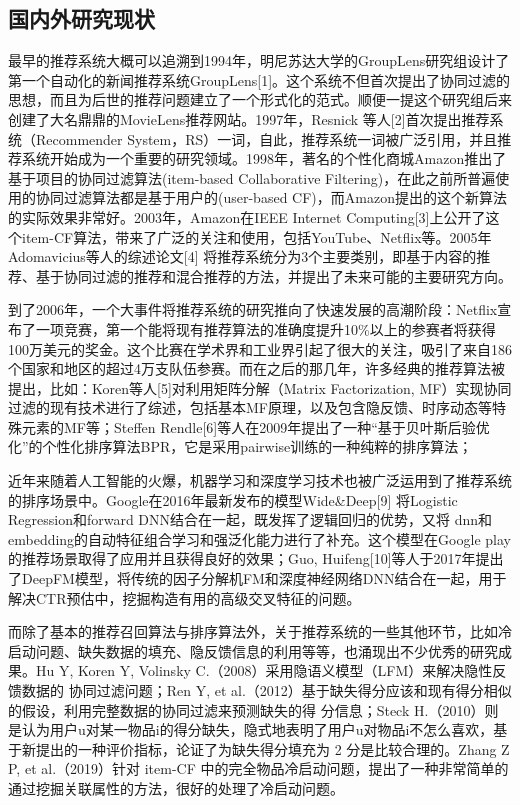 \documentclass{article}
\begin{document}
	\subsection{国内外研究现状}
	最早的推荐系统大概可以追溯到1994年，明尼苏达大学的GroupLens研究组设计了第一个自动化的新闻推荐系统GroupLens[1]。这个系统不但首次提出了协同过滤的思想，而且为后世的推荐问题建立了一个形式化的范式。顺便一提这个研究组后来创建了大名鼎鼎的MovieLens推荐网站。1997年，Resnick 等人[2]首次提出推荐系统（Recommender System，RS）一词，自此，推荐系统一词被广泛引用，并且推荐系统开始成为一个重要的研究领域。1998年，著名的个性化商城Amazon推出了基于项目的协同过滤算法(item-based Collaborative Filtering)，在此之前所普遍使用的协同过滤算法都是基于用户的(user-based CF)，而Amazon提出的这个新算法的实际效果非常好。2003年，Amazon在IEEE Internet Computing[3]上公开了这个item-CF算法，带来了广泛的关注和使用，包括YouTube、Netflix等。2005年Adomavicius等人的综述论文[4] 将推荐系统分为3个主要类别，即基于内容的推荐、基于协同过滤的推荐和混合推荐的方法，并提出了未来可能的主要研究方向。

	到了2006年，一个大事件将推荐系统的研究推向了快速发展的高潮阶段：Netflix宣布了一项竞赛，第一个能将现有推荐算法的准确度提升10\%以上的参赛者将获得100万美元的奖金。这个比赛在学术界和工业界引起了很大的关注，吸引了来自186个国家和地区的超过4万支队伍参赛。而在之后的那几年，许多经典的推荐算法被提出，比如：Koren等人[5]对利用矩阵分解（Matrix Factorization, MF）实现协同过滤的现有技术进行了综述，包括基本MF原理，以及包含隐反馈、时序动态等特殊元素的MF等；Steffen Rendle[6]等人在2009年提出了一种“基于贝叶斯后验优化”的个性化排序算法BPR，它是采用pairwise训练的一种纯粹的排序算法；

	近年来随着人工智能的火爆，机器学习和深度学习技术也被广泛运用到了推荐系统的排序场景中。Google在2016年最新发布的模型Wide\&Deep[9]
	将Logistic Regression和forward DNN结合在一起，既发挥了逻辑回归的优势，又将
	dnn和embedding的自动特征组合学习和强泛化能力进行了补充。这个模型在Google play的推荐场景取得了应用并且获得良好的效果；Guo, Huifeng[10]等人于2017年提出了DeepFM模型，将传统的因子分解机FM和深度神经网络DNN结合在一起，用于解决CTR预估中，挖掘构造有用的高级交叉特征的问题。

	而除了基本的推荐召回算法与排序算法外，关于推荐系统的一些其他环节，比如冷启动问题、缺失数据的填充、隐反馈信息的利用等等，也涌现出不少优秀的研究成果。Hu Y, Koren Y, Volinsky C.（2008）采用隐语义模型（LFM）来解决隐性反馈数据的
	协同过滤问题；Ren Y, et al.（2012）基于缺失得分应该和现有得分相似的假设，利用完整数据的协同过滤来预测缺失的得
	分信息；Steck H.（2010）则是认为用户u对某一物品i的得分缺失，隐式地表明了用户u对物品i不怎么喜欢，基于新提出的一种评价指标，论证了为缺失得分填充为 2 分是比较合理的。Zhang Z P, et al.（2019）针对 item-CF 中的完全物品冷启动问题，提出了一种非常简单的通过挖掘关联属性的方法，很好的处理了冷启动问题。
\end{document}
